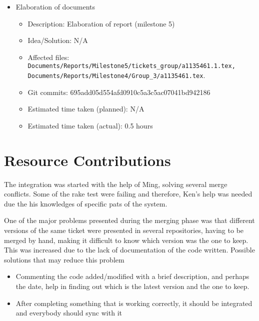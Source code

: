 \documentclass{article}
\begin{document}
\begin{itemize}
                
	\item Elaboration of documents
	     \begin{itemize}
	         \item Description: Elaboration of report (milestone 5)
	         \item Idea/Solution: N/A
	         \item Affected files: \texttt{Documents/Reports/Milestone5/tickets\_group/a1135461.1.tex, Documents/Reports/Milestone4/Group\_3/a1135461.tex}.  
	         \item Git commits:  695add05d554afd0910c5a3c5ac07041bd942186
		 \item Estimated time taken (planned): N/A
	         \item Estimated time taken (actual): 0.5 hours 
	     \end{itemize}
\end{itemize}

\section*{Resource Contributions}

The integration was started with the help of Ming, solving several merge conflicts.  Some of the rake test were failing and therefore, Ken's help was needed due the his knowledges of specific pats of the system.

One of the major problems presented during the merging phase was that different versions of the same ticket were presented in several repositories, having to be merged by hand, making it difficult to know which version was the one to keep.  This was increased due to the lack of documentation of the code written.  Possible solutions that may reduce this problem
\begin{itemize}
 \item  Commenting the code added/modified with a brief description, and perhaps the date, help in finding out which is the latest version and the one to keep.
 \item  After completing something that is working correctly, it should be integrated and everybody should sync with it
\end{itemize}
\end{document}
